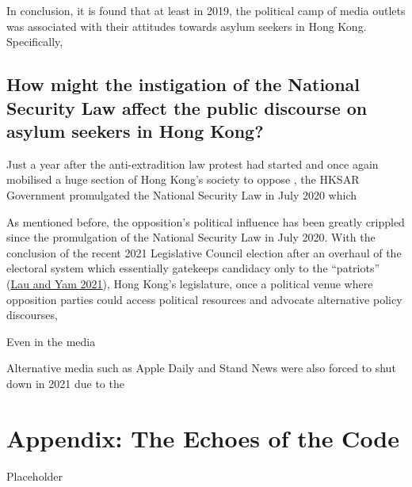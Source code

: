 \documentclass[a4paper, oneside]{report}
\begin{document}
In conclusion, it is found that at least in 2019, the political camp of
media outlets was associated with their attitudes towards asylum seekers
in Hong Kong. Specifically,

\hypertarget{how-might-the-instigation-of-the-national-security-law-affect-the-public-discourse-on-asylum-seekers-in-hong-kong}{%
\section{How might the instigation of the National Security Law affect
the public discourse on asylum seekers in Hong
Kong?}\label{how-might-the-instigation-of-the-national-security-law-affect-the-public-discourse-on-asylum-seekers-in-hong-kong}}

Just a year after the anti-extradition law protest had started and once
again mobilised a huge section of Hong Kong's society to oppose , the
HKSAR Government promulgated the National Security Law in July 2020
which

As mentioned before, the opposition's political influence has been
greatly crippled since the promulgation of the National Security Law in
July 2020. With the conclusion of the recent 2021 Legislative Council
election after an overhaul of the electoral system which essentially
gatekeeps candidacy only to the ``patriots''
(\protect\hyperlink{ref-lauPatriotsOnlyHong2021}{Lau and Yam 2021}),
Hong Kong's legislature, once a political venue where opposition parties
could access political resources and advocate alternative policy
discourses,

Even in the media

Alternative media such as Apple Daily and Stand News were also forced to
shut down in 2021 due to the

\hypertarget{appendix-the-echoes-of-the-code}{%
\chapter*{Appendix: The Echoes of the
Code}\label{appendix-the-echoes-of-the-code}}

Placeholder

\end{document}
